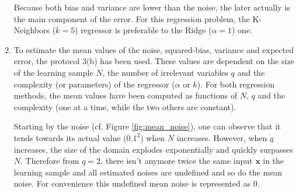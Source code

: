 \documentclass[a4paper, 12pt]{article}
\begin{document}
\begin{enumerate}[label=(\alph*)]
        Because both bias and variance are lower than the noise, the later actually is the main component of the error. For this regression problem, the K-Neighbors ($k = 5$) regressor is preferable to the Ridge ($\alpha = 1$) one.
        
        \item To estimate the mean values of the noise, squared-bias, variance and expected error, the protocol 3(b) has been used. These values are dependent on the size of the learning sample $N$, the number of irrelevant variables $q$ and the complexity (or parameters) of the regressor ($\alpha$ or $k$). For both regression methods, the mean values have been computed as functions of $N$, $q$ and the complexity (one at a time, while the two others are constant).
        
        Starting by the noise (cf. Figure \ref{fig:mean_noise}), one can observe that it tends towards its actual value ($0.1^2$) when $N$ increases. However, when $q$ increases, the size of the domain explodes exponentially and quickly surpasses $N$. Therefore from $q = 2$, there isn't anymore twice the same input $\bm{x}$ in the learning sample and all estimated noises are undefined and so do the mean noise. For convenience this undefined mean noise is represented as $0$.
        

\end{enumerate}
\end{document}
